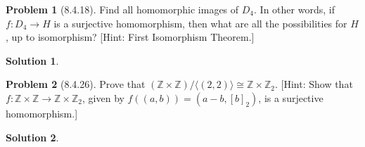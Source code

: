 \documentclass[12pt]{article}
\theoremstyle{definition}
\newtheorem*{prob}{Problem}
\newtheorem*{soln}{Solution}
\newcommand{\ZZ}{{\mathbb{Z}}}
\begin{document}
\begin{prob}[8.4.18]
Find all homomorphic images of  $D_4$.
In other words, if $f:D_4 \to H$ is a surjective homomorphism,
then what are all the possibilities for $H$, up to isomorphism? [Hint: 
First Isomorphism Theorem.]
\end{prob}

\begin{soln}

\end{soln}

\begin{prob}[8.4.26]
Prove that $(\ZZ \times \ZZ)/\langle (2, 2) \rangle \cong \ZZ \times \ZZ_2$. 
[Hint: Show that $f:\ZZ \times \ZZ \to \ZZ \times \ZZ_2$, given by 
$f ((a, b)) = (a - b, [b]_2)$, 
is a surjective homomorphism.]
\end{prob}

\begin{soln}

\end{soln}
\end{document}
